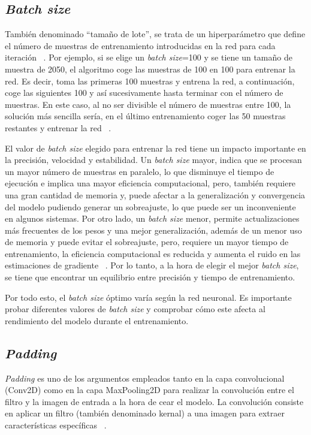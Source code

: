 \subsection{\textit{Batch size}}
También denominado ``tamaño de lote'', se trata de un hiperparámetro que define el número de muestras de entrenamiento introducidas en la red para cada iteración ~\cite{link24}. Por ejemplo, si se elige un \textit{batch size}=100 y se tiene un tamaño de muestra de 2050, el algoritmo coge las muestras de 100 en 100 para entrenar la red. Es decir, toma las primeras 100 muestras y entrena la red, a continuación, coge las siguientes 100 y así sucesivamente hasta terminar con el número de muestras. En este caso, al no ser divisible el número de muestras entre 100, la solución más sencilla sería, en el último entrenamiento coger las 50 muestras restantes y entrenar la red ~\cite{stack24}.

El valor de \textit{batch size} elegido para entrenar la red tiene un impacto importante en la precisión, velocidad y estabilidad. Un \textit{batch size} mayor, indica que se procesan un mayor número de muestras en paralelo, lo que disminuye el tiempo de ejecución e implica una mayor eficiencia computacional, pero, también requiere una gran cantidad de memoria y, puede afectar a la generalización y convergencia del modelo pudiendo generar un sobreajuste, lo que puede ser un inconveniente en algunos sistemas. Por otro lado, un \textit{batch size} menor, permite actualizaciones más frecuentes de los pesos y una mejor generalización, además de un menor uso de memoria y puede evitar el sobreajuste, pero, requiere un mayor tiempo de entrenamiento, la eficiencia computacional es reducida y aumenta el ruido en las estimaciones de gradiente ~\cite{link24}. Por lo tanto, a la hora de elegir el mejor \textit{batch size}, se tiene que encontrar un equilibrio entre precisión y tiempo de entrenamiento.

Por todo esto, el \textit{batch size} óptimo varía según la red neuronal. Es importante probar diferentes valores de \textit{batch size} y comprobar cómo este afecta al rendimiento del modelo durante el entrenamiento. 

\subsection{\textit{Padding}}

\textit{Padding} es uno de los argumentos empleados tanto en la capa convolucional (Conv2D) como en la capa MaxPooling2D para realizar la convolución entre el filtro y la imagen de entrada a la hora de cear el modelo. La convolución consiste en aplicar un filtro (también denominado kernal) a una imagen para extraer características específicas ~\cite{diego23}.

